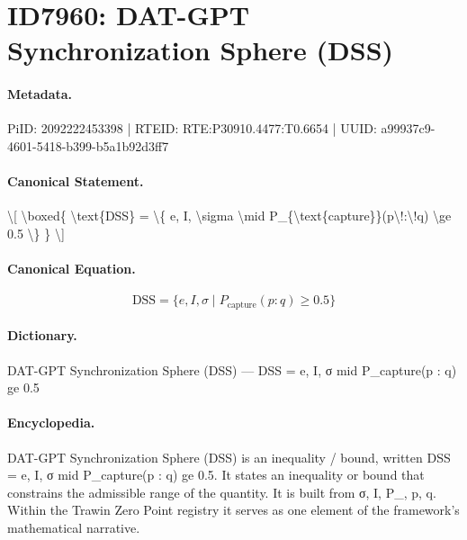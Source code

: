 \section*{ID7960: DAT-GPT Synchronization Sphere (DSS)}
\paragraph{Metadata.}
PiID: 2092222453398 | RTEID: RTE:P30910.4477:T0.6654 | UUID: a99937c9-4601-5418-b399-b5a1b92d3ff7

\paragraph{Canonical Statement.}
\textbackslash{}[ \textbackslash{}boxed\{ \textbackslash{}text\{DSS\} = \textbackslash{}\{ e, I, \textbackslash{}sigma \textbackslash{}mid P\_\{\textbackslash{}text\{capture\}\}(p\textbackslash{}!:\textbackslash{}!q) \textbackslash{}ge 0.5 \textbackslash{}\} \} \textbackslash{}]

\paragraph{Canonical Equation.}
\[
\boxed{ \text{DSS} = \{ e, I, \sigma \mid P_{\text{capture}}(p\!:\!q) \ge 0.5 \} }
\]

\paragraph{Dictionary.}
DAT-GPT Synchronization Sphere (DSS) — DSS = e, I, σ mid P\_capture(p : q) ge 0.5

\paragraph{Encyclopedia.}
DAT-GPT Synchronization Sphere (DSS) is an inequality / bound, written DSS = e, I, σ mid P\_capture(p : q) ge 0.5. It states an inequality or bound that constrains the admissible range of the quantity. It is built from σ, I, P\_, p, q. Within the Trawin Zero Point registry it serves as one element of the framework's mathematical narrative.
